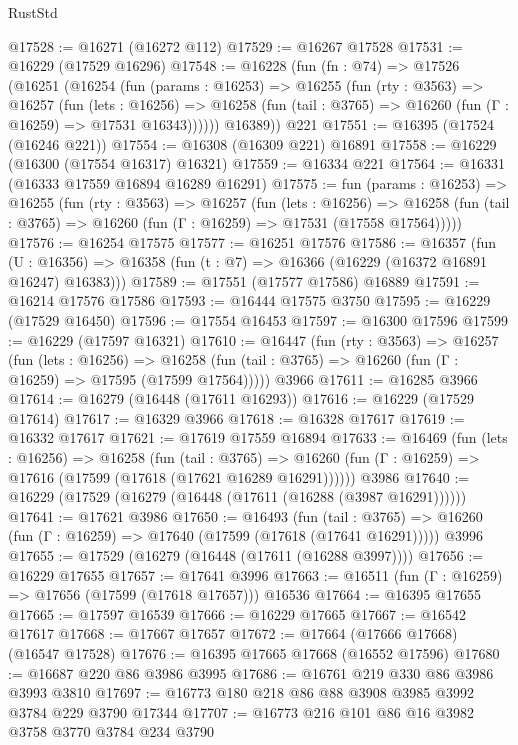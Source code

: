 \begin{lexlean}{RustStd}
\begin{coremodule}
@17528 := @16271 (@16272 @112)
@17529 := @16267 @17528
@17531 := @16229 (@17529 @16296)
@17548 := @16228
    (fun (fn : @74) =>
    @17526
      (@16251
        (@16254
          (fun (params : @16253) =>
          @16255
            (fun (rty : @3563) =>
            @16257
              (fun (lets : @16256) =>
              @16258 (fun (tail : @3765) => @16260 (fun (Γ : @16259) => @17531 @16343))))))
        @16389))
    @221
@17551 := @16395 (@17524 (@16246 @221))
@17554 := @16308 (@16309 @221) @16891
@17558 := @16229 (@16300 (@17554 @16317) @16321)
@17559 := @16334 @221
@17564 := @16331 (@16333 @17559 @16894 @16289 @16291)
@17575 := fun (params : @16253) =>
  @16255
    (fun (rty : @3563) =>
    @16257
      (fun (lets : @16256) =>
      @16258 (fun (tail : @3765) => @16260 (fun (Γ : @16259) => @17531 (@17558 @17564)))))
@17576 := @16254 @17575
@17577 := @16251 @17576
@17586 := @16357
    (fun (U : @16356) => @16358 (fun (t : @7) => @16366 (@16229 (@16372 @16891 @16247) @16383)))
@17589 := @17551 (@17577 @17586) @16889
@17591 := @16214 @17576 @17586
@17593 := @16444 @17575 @3750
@17595 := @16229 (@17529 @16450)
@17596 := @17554 @16453
@17597 := @16300 @17596
@17599 := @16229 (@17597 @16321)
@17610 := @16447
    (fun (rty : @3563) =>
    @16257
      (fun (lets : @16256) =>
      @16258 (fun (tail : @3765) => @16260 (fun (Γ : @16259) => @17595 (@17599 @17564)))))
    @3966
@17611 := @16285 @3966
@17614 := @16279 (@16448 (@17611 @16293))
@17616 := @16229 (@17529 @17614)
@17617 := @16329 @3966
@17618 := @16328 @17617
@17619 := @16332 @17617
@17621 := @17619 @17559 @16894
@17633 := @16469
    (fun (lets : @16256) =>
    @16258
      (fun (tail : @3765) =>
      @16260 (fun (Γ : @16259) => @17616 (@17599 (@17618 (@17621 @16289 @16291))))))
    @3986
@17640 := @16229 (@17529 (@16279 (@16448 (@17611 (@16288 (@3987 @16291))))))
@17641 := @17621 @3986
@17650 := @16493
    (fun (tail : @3765) => @16260 (fun (Γ : @16259) => @17640 (@17599 (@17618 (@17641 @16291)))))
    @3996
@17655 := @17529 (@16279 (@16448 (@17611 (@16288 @3997))))
@17656 := @16229 @17655
@17657 := @17641 @3996
@17663 := @16511 (fun (Γ : @16259) => @17656 (@17599 (@17618 @17657))) @16536
@17664 := @16395 @17655
@17665 := @17597 @16539
@17666 := @16229 @17665
@17667 := @16542 @17617
@17668 := @17667 @17657
@17672 := @17664 (@17666 @17668) (@16547 @17528)
@17676 := @16395 @17665 @17668 (@16552 @17596)
@17680 := @16687 @220 @86 @3986 @3995
@17686 := @16761 @219 @330 @86 @3986 @3993 @3810
@17697 := @16773 @180 @218 @86 @88 @3908 @3985 @3992 @3784 @229 @3790 @17344
@17707 := @16773 @216 @101 @86 @16 @3982 @3758 @3770 @3784 @234 @3790

\end{coremodule}
\end{lexlean}
